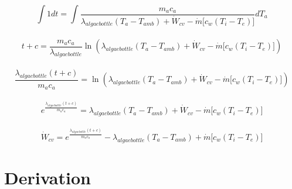 \documentclass[10pt,a4paper]{IEEEtran}
\begin{document}
\begin{enumerate}
		$$\int 1 dt = \int \frac{m_a c_a}{\lambda_{algaebottle} \left( T_a - T_{amb} \right) + \dot{W}_{cv} - \dot{m} \lbrack c_w \left( T_i - T_e \right) \rbrack} dT_a$$ \\
		$$t+ c = \frac{m_a c_a}{\lambda_{algaebottle}} \ln(\lambda_{algaebottle} \left( T_a - T_{amb} \right) + \dot{W}_{cv} - \dot{m} \lbrack c_w \left( T_i - T_e \right) \rbrack)$$ \\
		$$\frac{\lambda_{algaebottle} \left( t + c \right)}{m_a c_a} = \ln(\lambda_{algaebottle} \left( T_a - T_{amb} \right) + \dot{W}_{cv} - \dot{m} \lbrack c_w \left( T_i - T_e \right) \rbrack)$$ \\
		$$e^{\frac{\lambda_{algaebottle} \left( t + c \right)}{m_a c_a}} = \lambda_{algaebottle} \left( T_a - T_{amb} \right) + \dot{W}_{cv} - \dot{m} \lbrack c_w \left( T_i - T_e \right) \rbrack$$ \\
		$$\dot{W}_{cv} = e^{\frac{\lambda_{algaebottle} \left( t + c \right)}{m_a c_a}} - \lambda_{algaebottle} \left( T_a - T_{amb} \right) + \dot{m} \lbrack c_w \left( T_i - T_e \right) \rbrack$$
	\end{enumerate}
	
	\section{Derivation}
	
	
	
\end{document}
